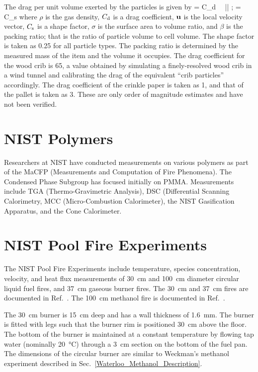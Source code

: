 The drag per unit volume exerted by the particles is given by
\be
    =  C_{\rm d} \, \kappa \, \bu |\bu|   \quad ; \quad \kappa = C_{\rm s} \sigma \beta
\ee
where $\rho$ is the gas density, $C_{\rm d}$ is a drag coefficient, ${\bf u}$ is the local velocity vector, $C_{\rm s}$ is a shape factor, $\sigma$ is the surface area to volume ratio, and $\beta$ is the packing ratio; that is the ratio of particle volume to cell volume. The shape factor is taken as 0.25 for all particle types. The packing ratio is determined by the measured mass of the item and the volume it occupies. The drag coefficient for the wood crib is 65, a value obtained by simulating a finely-resolved wood crib in a wind tunnel and calibrating the drag of the equivalent ``crib particles'' accordingly. The drag coefficient of the crinkle paper is taken as 1, and that of the pallet is taken as 3. These are only order of magnitude estimates and have not been verified.


\section{NIST Polymers}
\label{NIST_Polymers_Description}

Researchers at NIST have conducted measurements on various polymers as part of the MaCFP (Measurements and Computation of Fire Phenomena). The Condensed Phase Subgroup has focused initially on PMMA. Measurements include TGA (Thermo-Gravimetric Analysis), DSC (Differential Scanning Calorimetry, MCC (Micro-Combustion Calorimeter), the NIST Gasification Apparatus, and the Cone Calorimeter.



\section{NIST Pool Fire Experiments}
\label{NIST_Pool_Fires_Description}

The NIST Pool Fire Experiments include temperature, species concentration, velocity, and heat flux measurements of 30~cm and 100~cm diameter circular liquid fuel fires, and 37~cm gaseous burner fires. The 30~cm and 37~cm fires are documented in Ref.~\cite{Sung:TN2162r1}. The 100~cm methanol fire is documented in Ref.~\cite{Sung:TN2083}.

The 30~cm burner is 15~cm deep and has a wall thickness of 1.6~mm. The burner is fitted with legs such that the burner rim is positioned 30~cm above the floor. The bottom of the burner is maintained at a constant temperature by flowing tap water (nominally 20~\unit{\degreeCelsius}) through a 3~cm section on the bottom of the fuel pan. The dimensions of the circular burner are similar to Weckman's methanol experiment described in Sec.~\ref{Waterloo_Methanol_Description}.


